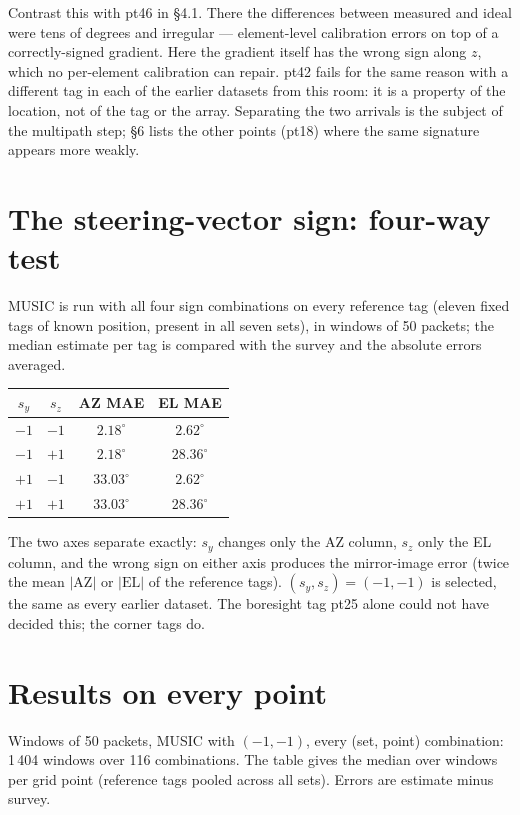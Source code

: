 \documentclass[11pt,a4paper]{article}
\begin{document}
Contrast this with pt46 in \S4.1. There the differences between measured and ideal were tens of degrees and irregular --- element-level calibration errors on top of a correctly-signed gradient. Here the gradient itself has the wrong sign along $z$, which no per-element calibration can repair. pt42 fails for the same reason with a different tag in each of the earlier datasets from this room: it is a property of the location, not of the tag or the array. Separating the two arrivals is the subject of the multipath step; \S6 lists the other points (pt18) where the same signature appears more weakly.

\section{The steering-vector sign: four-way test}\label{sec:fourway}
MUSIC is run with all four sign combinations on every reference tag (eleven fixed tags of known position, present in all seven sets), in windows of 50 packets; the median estimate per tag is compared with the survey and the absolute errors averaged.

\begin{center}
\begin{tabular}{cc|cc}
\toprule
$s_y$ & $s_z$ & AZ MAE & EL MAE \\
\midrule
$-1$ & $-1$ & $\mathbf{2.18^\circ}$ & $\mathbf{2.62^\circ}$ \\
$-1$ & $+1$ & $2.18^\circ$ & $28.36^\circ$ \\
$+1$ & $-1$ & $33.03^\circ$ & $2.62^\circ$ \\
$+1$ & $+1$ & $33.03^\circ$ & $28.36^\circ$ \\
\bottomrule
\end{tabular}
\end{center}

The two axes separate exactly: $s_y$ changes only the AZ column, $s_z$ only the EL column, and the wrong sign on either axis produces the mirror-image error (twice the mean $|\mathrm{AZ}|$ or $|\mathrm{EL}|$ of the reference tags). $(s_y, s_z) = (-1, -1)$ is selected, the same as every earlier dataset. The boresight tag pt25 alone could not have decided this; the corner tags do.

\section{Results on every point}
Windows of 50 packets, MUSIC with $(-1, -1)$, every (set, point) combination: 1\,404 windows over 116 combinations. The table gives the median over windows per grid point (reference tags pooled across all sets). Errors are estimate minus survey.
\end{document}
